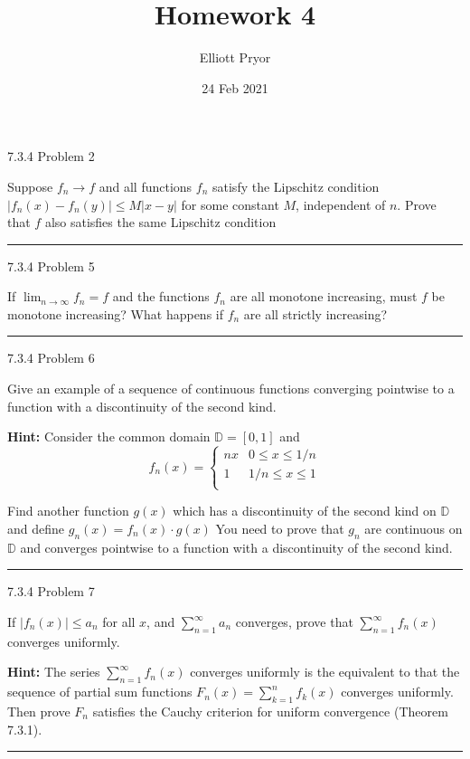 \documentclass[11pt]{article}
\title{Homework 4}
\author{Elliott Pryor}
\date{24 Feb 2021}
\begin{document}
\maketitle

 7.3.4 Problem 2

Suppose $f_n \to f$ and all functions $f_n$ satisfy the Lipschitz condition
$|f_n(x) - f_n(y)| \leq M |x-y|$ for some constant $M$, independent of $n$.
Prove that $f$ also satisfies the same Lipschitz condition

\hrule










 7.3.4 Problem 5

If $\lim_{n \to \infty} f_n = f$ and the functions $f_n$ are all monotone increasing, must $f$ be monotone increasing?
What happens if $f_n$ are all strictly increasing?

\hrule






 7.3.4 Problem 6

Give an example of a sequence of continuous functions converging pointwise to a function
with a discontinuity of the second kind.

\textbf{Hint:} Consider the common domain $\mathbb{D} = [0,1]$ and 
$$f_n (x) = \begin{cases}
    nx & 0 \leq x \leq 1/n \\
    1 & 1/n \leq x \leq 1 \\
\end{cases}$$

Find another function $g(x)$ which has a discontinuity of the second kind on $\mathbb{D}$ and define 
$g_n(x) = f_n(x) \cdot g(x)$
You need to prove that $g_n$ are continuous on $\mathbb{D}$ and converges pointwise to a function with a 
discontinuity of the second kind.

\hrule





 7.3.4 Problem 7

If $|f_n(x)| \leq a_n$ for all $x$, and $\sum_{n = 1}^ \infty a_n$ converges,
prove that $\sum_{n = 1}^ \infty f_n(x)$ converges uniformly.

\textbf{Hint:}
The series $\sum_{n = 1}^ \infty f_n(x)$ converges uniformly is the equivalent to that the sequence
of partial sum functions $F_n(x) = \sum_{k = 1} ^n f_k(x)$ converges uniformly. 
Then prove $F_n$ satisfies the Cauchy criterion for uniform convergence (Theorem 7.3.1).

\hrule
\end{document}

